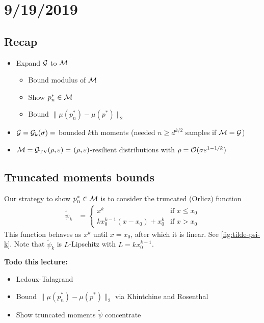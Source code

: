 \section{9/19/2019}

\subsection{Recap}

\begin{itemize}
  \item Expand $\mathcal{G}$ to $\mathcal{M}$
    \begin{itemize}
      \item Bound modulus of $\mathcal{M}$
      \item Show $p_n^* \in \mathcal{M}$
      \item Bound $\|\mu(p_n^*) - \mu(p^*)\|_2$
    \end{itemize}
  \item $\mathcal{G} = \mathcal{G}_k(\sigma) =$ bounded $k$th moments
    (needed $n \geq d^{k/2}$ samples if $\mathcal{M} = \mathcal{G}$)
  \item $\mathcal{M} = \mathcal{G}_{\operatorname{TV}}(\rho, \varepsilon) =$ $(\rho, \varepsilon)$-resilient distributions
    with $\rho = \mathcal{O}(\sigma \varepsilon^{1 - 1/k})$
\end{itemize}

\subsection{Truncated moments bounds}

Our strategy to show $p_n^* \in \mathcal{M}$ is to consider the truncated (Orlicz)
function
\begin{align}
  \tilde{\psi}_k &= \begin{cases}
    x^k &\text{if } x \leq x_0 \\
    k x_0^{k-1} (x - x_0) + x_0^k&\text{if } x > x_0
  \end{cases}
\end{align}
This function behaves as $x^k$ until $x=x_0$, after which it is linear.
See \cref{fig:tilde-psi-k}.
Note that $\tilde{\psi}_k$ is $L$-Lipschitz with $L = k x_0^{k-1}$.

\textbf{Todo this lecture:}
\begin{itemize}
  \item Ledoux-Talagrand
  \item Bound $\|\mu(p_n^*) - \mu(p^*)\|_2$ via Khintchine and Rosenthal
  \item Show truncated moments $\tilde{\psi}$ concentrate
\end{itemize}

